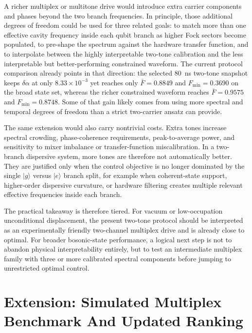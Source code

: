 \documentclass[aps,pra,twocolumn,reprint,floatfix,amsmath,amssymb]{revtex4-2}
\begin{document}
A richer multiplex or multitone drive would introduce extra carrier components and phases beyond the two branch frequencies. In principle, those additional degrees of freedom could be used for three related goals: to match more than one effective cavity frequency inside each qubit branch as higher Fock sectors become populated, to pre-shape the spectrum against the hardware transfer function, and to interpolate between the highly interpretable two-tone calibration and the less interpretable but better-performing constrained waveform. The current protocol comparison already points in that direction: the selected \SI{80}{\nano\second} two-tone snapshot keeps \(\delta\alpha\) at only \(8.33\times10^{-3}\) yet reaches only \(\bar{F}=0.8849\) and \(F_{\min}=0.3690\) on the broad state set, whereas the richer constrained waveform reaches \(\bar{F}=0.9575\) and \(F_{\min}=0.8748\). Some of that gain likely comes from using more spectral and temporal degrees of freedom than a strict two-carrier ansatz can provide.

The same extension would also carry nontrivial costs. Extra tones increase spectral crowding, phase-coherence requirements, peak-to-average power, and sensitivity to mixer imbalance or transfer-function miscalibration. In a two-branch dispersive system, more tones are therefore not automatically better. They are justified only when the control objective is no longer dominated by the single \(|g\rangle\) versus \(|e\rangle\) branch split, for example when coherent-state support, higher-order dispersive curvature, or hardware filtering creates multiple relevant effective frequencies inside each branch.

The practical takeaway is therefore tiered. For vacuum or low-occupation unconditional displacement, the present two-tone protocol should be interpreted as an experimentally friendly two-channel multiplex drive and is already close to optimal. For broader bosonic-state performance, a logical next step is not to abandon physical interpretability entirely, but to test an intermediate multiplex family with three or more calibrated spectral components before jumping to unrestricted optimal control.

\section{Extension: Simulated Multiplex Benchmark And Updated Ranking}
\end{document}

